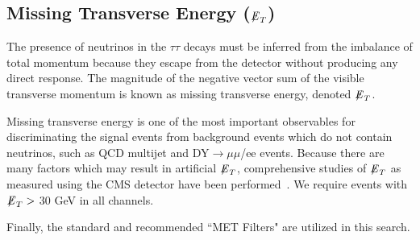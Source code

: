 \subsection{\texorpdfstring{Missing Transverse Energy (${\not\mathrel{E}}_T$)}{Missing transverse energy}}\label{ss:met}

The presence of neutrinos in the $\tau\tau$ decays must be inferred from the imbalance of total momentum because they escape from the detector without producing 
any direct response. The magnitude of the negative vector sum of the visible transverse momentum is known as missing transverse energy, denoted ${\not\mathrel{E}}_T$.

Missing transverse energy is one of the most important observables for discriminating the signal events from background events which do not contain neutrinos, 
such as QCD multijet and DY$\to\mu\mu$/ee events.
Because there are many factors which may result in artificial ${\not\mathrel{E}}_T$, comprehensive studies of ${\not\mathrel{E}}_T$ as measured using the CMS detector have been 
performed~\cite{MET}. We require events with ${\not\mathrel{E}}_T >$ 30 GeV in all channels.

Finally, the standard and recommended ``MET Filters" are utilized in this search\cite{CMS-PAS-PFT-09-001}\cite{MET}.
